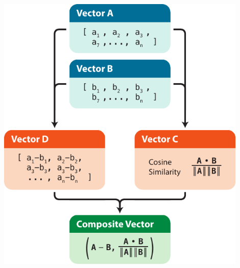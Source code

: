 \documentclass[aspectratio=169,10pt]{beamer}
\begin{document}
\begin{frame}
\begin{columns}[T]
        \begin{column}{0.4\textwidth}
            \hfill\\\vspace{0.5em}
            \centering
            \includegraphics[width=0.9\textwidth]{composite_distance_vector_generation.pdf} %
        \end{column}
    \end{columns}
\end{frame}
\end{document}
